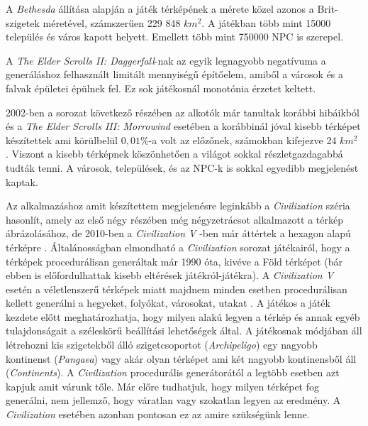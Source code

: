 A \textit{Bethesda} állítása alapján a játék térképének a mérete közel azonos a Brit-szigetek méretével, számszerűen 229 848 $km^2$. A játékban több mint 15000 település és város kapott helyett. Emellett több mint 750000 NPC is szerepel. 

A \textit{The Elder Scrolls II: Daggerfall}-nak az egyik legnagyobb negatívuma a generáláshoz felhasznált limitált mennyiségű építőelem, amiből a városok és a falvak épületei épülnek fel. Ez sok játékosnál monotónia érzetet keltett. 

2002-ben a sorozat következő részében az alkotók már tanultak korábbi hibáikból és a \textit{The Elder Scrolls III: Morrowind} esetében a korábbinál jóval kisebb térképet készítettek ami körülbelül $0,01 \%$-a volt az előzőnek, számokban kifejezve 24 $km^2$ \cite{Daggerfall}. Viszont a kisebb térképnek köszönhetően a világot sokkal részletgazdagabbá tudták tenni. A városok, települések, és az NPC-k is sokkal egyedibb megjelenést kaptak.

Az alkalmazáshoz amit készítettem megjelenésre leginkább a \textit{Civilization} széria hasonlít, amely az első négy részében még négyzetrácsot alkalmazott a térkép ábrázolásához, de 2010-ben a \textit{Civilization V} -ben már áttértek a hexagon alapú térképre \cite{Civ1}. Általánosságban elmondható a \textit{Civilization} sorozat játékairól, hogy a térképek procedurálisan generáltak már 1990 óta, kivéve a Föld térképet (bár ebben is előfordulhattak kisebb eltérések játékról-játékra). A \textit{Civilization V} esetén a véletlenszerű térképek miatt majdnem minden esetben procedurálisan kellett generálni a hegyeket, folyókat, városokat, utakat \cite{CivV}. A játékos a játék kezdete előtt meghatározhatja, hogy milyen alakú legyen a térkép és annak egyéb tulajdonságait a széleskörű beállítási lehetőségek által. A játékosnak módjában áll létrehozni kis szigetekből álló szigetcsoportot (\textit{Archipeligo}) egy nagyobb kontinenst (\textit{Pangaea}) vagy akár olyan térképet ami két nagyobb kontinensből áll (\textit{Continents}). A \textit{Civilization} procedurális generátorától a legtöbb esetben azt kapjuk amit várunk tőle. Már előre tudhatjuk, hogy milyen térképet fog generálni, nem jellemző, hogy váratlan vagy szokatlan legyen az eredmény. A \textit{Civilization} esetében azonban pontosan ez az amire szükségünk lenne.

